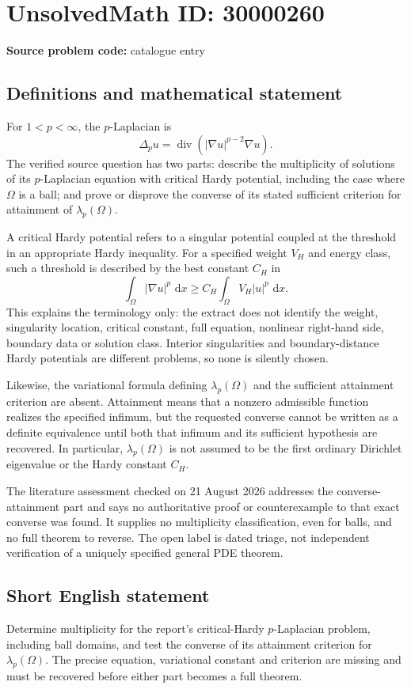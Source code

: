 \documentclass[11pt]{article}
\newcommand{\dd}{\,\mathrm{d}}
\begin{document}
\section*{UnsolvedMath ID: 30000260}
\textbf{Source problem code:} catalogue entry
\subsection{Definitions and mathematical statement}
For $1<p<\infty$, the $p$-Laplacian is
\[
 \Delta_pu=\operatorname{div}(|\nabla u|^{p-2}\nabla u).
\]
The verified source question has two parts: describe the multiplicity of solutions of its $p$-Laplacian equation with critical Hardy potential, including the case where $\Omega$ is a ball; and prove or disprove the converse of its stated sufficient criterion for attainment of $\lambda_p(\Omega)$.

A critical Hardy potential refers to a singular potential coupled at the threshold in an appropriate Hardy inequality. For a specified weight $V_H$ and energy class, such a threshold is described by the best constant $C_H$ in
\[
 \int_\Omega|\nabla u|^p\,\dd x
 \ge C_H\int_\Omega V_H|u|^p\,\dd x.
\]
This explains the terminology only: the extract does not identify the weight, singularity location, critical constant, full equation, nonlinear right-hand side, boundary data or solution class. Interior singularities and boundary-distance Hardy potentials are different problems, so none is silently chosen.

Likewise, the variational formula defining $\lambda_p(\Omega)$ and the sufficient attainment criterion are absent. Attainment means that a nonzero admissible function realizes the specified infimum, but the requested converse cannot be written as a definite equivalence until both that infimum and its sufficient hypothesis are recovered. In particular, $\lambda_p(\Omega)$ is not assumed to be the first ordinary Dirichlet eigenvalue or the Hardy constant $C_H$.

The literature assessment checked on 21 August 2026 addresses the converse-attainment part and says no authoritative proof or counterexample to that exact converse was found. It supplies no multiplicity classification, even for balls, and no full theorem to reverse. The open label is dated triage, not independent verification of a uniquely specified general PDE theorem.
\subsection{Short English statement}
Determine multiplicity for the report's critical-Hardy $p$-Laplacian problem, including ball domains, and test the converse of its attainment criterion for $\lambda_p(\Omega)$. The precise equation, variational constant and criterion are missing and must be recovered before either part becomes a full theorem.
\end{document}
